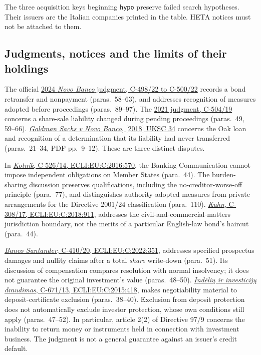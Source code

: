\documentclass[12pt,a4paper,oneside,openany]{book}
\begin{document}
The three acquisition keys beginning \texttt{hypo} preserve failed search
hypotheses. Their issuers are the Italian companies printed in the table.
HETA notices must not be attached to them.

\subsection{Judgments, notices and the limits of their holdings}

The official \href{../prospectus/corner-cases-2026-10-04/sources/jur-more-c498-judgment/source.html}
{2024 \emph{Novo Banco} judgment, C-498/22 to C-500/22}
records a bond retransfer and nonpayment (paras.~58--63), and addresses
recognition of measures adopted before proceedings (paras.~89--97).
The \href{../prospectus/corner-cases-2026-10-04/sources/jur-more-novo2021-judgment/source.html}
{2021 judgment, C-504/19}
concerns a share-sale liability changed during pending proceedings
(paras.~49, 59--66).
\href{../prospectus/corner-cases-2026-10-04/sources/jur-more-novo-generated/source.pdf}
{\emph{Goldman Sachs v Novo Banco}, [2018] UKSC 34}
concerns the Oak loan and recognition of a determination that its liability
had never transferred (paras.~21--34, PDF pp.~9--12).
These are three distinct disputes.

In \href{../prospectus/corner-cases-2026-10-04/sources/jur-more-kotnik-judgment/source.html}
{\emph{Kotnik}, C-526/14, ECLI:EU:C:2016:570},
the Banking Communication cannot impose independent obligations on Member
States (para.~44). The burden-sharing discussion preserves qualifications,
including the no-creditor-worse-off principle (para.~77), and distinguishes
authority-adopted measures from private arrangements for the Directive
2001/24 classification (para.~110).
\href{../prospectus/corner-cases-2026-10-04/sources/jur-more-kuhn-judgment/source.html}
{\emph{Kuhn}, C-308/17, ECLI:EU:C:2018:911},
addresses the civil-and-commercial-matters jurisdiction boundary, not
the merits of a particular English-law bond's haircut (para.~44).

\href{../prospectus/corner-cases-2026-10-04/sources/jur-more-santander-judgment/source.html}
{\emph{Banco Santander}, C-410/20, ECLI:EU:C:2022:351},
addresses specified prospectus damages and nullity claims after a total
\emph{share} write-down (para.~51). Its discussion of compensation compares
resolution with normal insolvency; it does not guarantee the original
investment's value (paras.~48--50).
\href{../prospectus/corner-cases-2026-10-04/sources/jur-more-indel-judgment/source.html}
{\emph{Indėlių ir investicijų draudimas}, C-671/13, ECLI:EU:C:2015:418},
makes negotiability material to deposit-certificate exclusion
(paras.~38--40). Exclusion from deposit protection does not automatically
exclude investor protection, whose own conditions still apply
(paras.~47--52). In particular, article 2(2) of Directive 97/9 concerns
the inability to return money or instruments held in connection with
investment business. The judgment is not a general guarantee against
an issuer's credit default.
\end{document}

